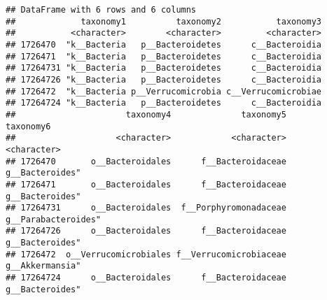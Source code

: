 \documentclass[
  oneside]{book}
\begin{document}
\begin{verbatim}
## DataFrame with 6 rows and 6 columns
##             taxonomy1          taxonomy2           taxonomy3
##           <character>        <character>         <character>
## 1726470  "k__Bacteria   p__Bacteroidetes      c__Bacteroidia
## 1726471  "k__Bacteria   p__Bacteroidetes      c__Bacteroidia
## 17264731 "k__Bacteria   p__Bacteroidetes      c__Bacteroidia
## 17264726 "k__Bacteria   p__Bacteroidetes      c__Bacteroidia
## 1726472  "k__Bacteria p__Verrucomicrobia c__Verrucomicrobiae
## 17264724 "k__Bacteria   p__Bacteroidetes      c__Bacteroidia
##                      taxonomy4              taxonomy5           taxonomy6
##                    <character>            <character>         <character>
## 1726470       o__Bacteroidales      f__Bacteroidaceae     g__Bacteroides"
## 1726471       o__Bacteroidales      f__Bacteroidaceae     g__Bacteroides"
## 17264731      o__Bacteroidales  f__Porphyromonadaceae g__Parabacteroides"
## 17264726      o__Bacteroidales      f__Bacteroidaceae     g__Bacteroides"
## 1726472  o__Verrucomicrobiales f__Verrucomicrobiaceae     g__Akkermansia"
## 17264724      o__Bacteroidales      f__Bacteroidaceae     g__Bacteroides"
\end{verbatim}
\end{document}
